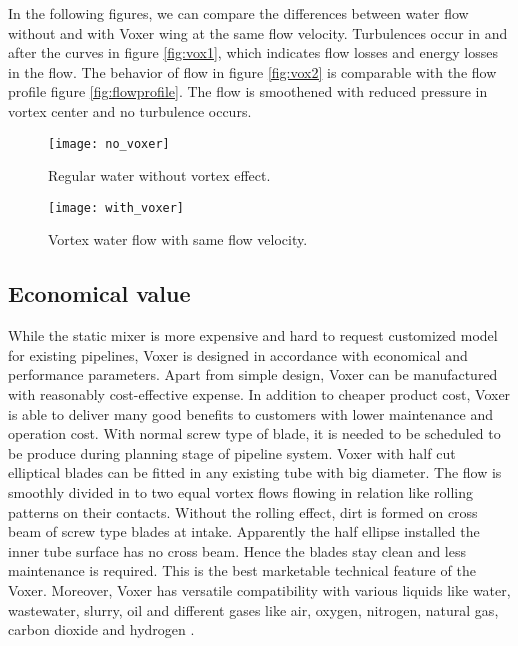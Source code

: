 In the following figures, we can compare the differences between water flow without and with Voxer wing at the same flow velocity. Turbulences occur in and after the curves in figure \vref{fig:vox1}, which indicates flow losses and energy losses in the flow. The behavior of flow in figure \vref{fig:vox2} is comparable with the flow profile figure \vref{fig:flowprofile}. The flow is smoothened with reduced pressure in vortex center and no turbulence occurs.
\begin{figure}[h]
  \centering
  \texttt{[image: no\_voxer]}
  \caption{ Regular water without vortex effect.\cite{voxer:article}}
  \label{fig:vox1}
\end{figure}
\begin{figure}[h]
  \centering
  \texttt{[image: with\_voxer]}
  \caption{ Vortex water flow with same flow velocity.\cite{voxer:article}}
  \label{fig:vox2}
\end{figure}

\subsection{Economical value}
While the static mixer is more expensive and hard to request customized model for existing pipelines, Voxer is designed in accordance with economical and performance parameters. Apart from simple design, Voxer can be manufactured with reasonably cost-effective expense. In addition to cheaper product cost, Voxer is able to deliver many good benefits to customers with lower maintenance and operation cost.
With normal screw type of blade, it is needed to be scheduled to be produce during planning stage of pipeline system. Voxer with half cut elliptical blades can be fitted in any existing tube with big diameter. The flow is smoothly divided in to two equal vortex flows flowing in relation like rolling patterns on their contacts. Without the rolling effect, dirt is formed on cross beam of screw type blades at intake. Apparently the half ellipse installed the inner tube surface has no cross beam. Hence the blades stay clean and less maintenance is required. This is the best marketable technical feature of the Voxer. Moreover, Voxer has versatile compatibility with various liquids like water, wastewater, slurry, oil and different gases like air, oxygen, nitrogen, natural gas, carbon dioxide and hydrogen \cite{voxer:article}. 
\clearpage %
